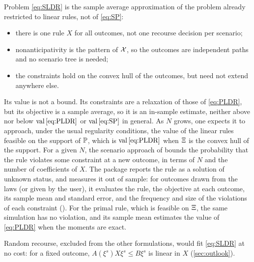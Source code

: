 Problem \eqref{eq:SLDR} is the sample average approximation \citep[Chapter~5]{ShapiroDentchevaRuszczynski2014} of the problem already restricted to linear rules, not of \eqref{eq:SP}:
\begin{itemize}[nosep]
\item there is one rule $X$ for all outcomes, not one recourse decision per scenario;
\item nonanticipativity is the pattern of $\mathcal{X}$, so the outcomes are independent paths and no scenario tree is needed;
\item the constraints hold on the convex hull of the outcomes, but need not extend anywhere else.
\end{itemize}
Its value is not a bound.
Its constraints are a relaxation of those of \eqref{eq:PLDR}, but its objective is a sample average,
so it is an in-sample estimate, neither above nor below $\operatorname{val}\eqref{eq:PLDR}$ or $\operatorname{val}\eqref{eq:SP}$ in general.
As $N$ grows, one expects it to approach, under the usual regularity conditions, the value of the linear rules feasible on the support of $\mathbb{P}$,
which is $\operatorname{val}\eqref{eq:PLDR}$ when $\Xi$ is the convex hull of the support.
For a given $N$, the scenario approach of \citet{CalafioreCampi2006} bounds the probability that the rule violates some constraint at a new outcome,
in terms of $N$ and the number of coefficients of $X$.
The package reports the rule as a solution of unknown status, and  measures it out of sample:
for outcomes drawn from the laws (or given by the user), it evaluates the rule, the objective at each outcome, its sample mean and standard error,
and the frequency and size of the violations of each constraint ().
For the primal rule, which is feasible on $\Xi$, the same simulation has no violation,
and its sample mean estimates the value of \eqref{eq:PLDR} when the moments are exact.

Random recourse, excluded from the other formulations, would fit \eqref{eq:SLDR} at no cost:
for a fixed outcome, $A(\xi^s)X\xi^s \le B\xi^s$ is linear in $X$ (\cref{sec:outlook}).
